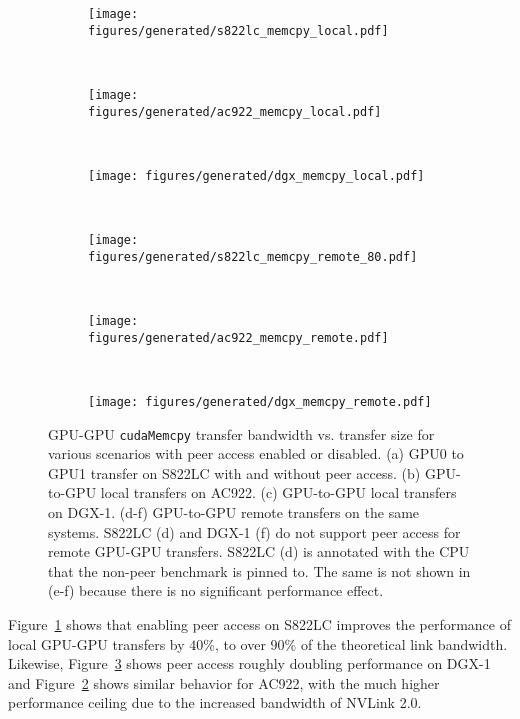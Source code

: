 \begin{figure}[H]
	\centering
	\begin{subfigure}[b]{0.3\textwidth}
		\texttt{[image: figures/generated/s822lc\_memcpy\_local.pdf]}
		\caption{}
		\label{fig:explicit-s822lc-gpu-gpu-local}
	\end{subfigure}
	~
	\begin{subfigure}[b]{0.3\textwidth}
		\texttt{[image: figures/generated/ac922\_memcpy\_local.pdf]}
		\caption{}
		\label{fig:explicit-ac922-gpu-gpu-local}
	\end{subfigure}
	~
	\begin{subfigure}[b]{0.3\textwidth}
		\texttt{[image: figures/generated/dgx\_memcpy\_local.pdf]}
		\caption{}
		\label{fig:explicit-dgx-gpu-gpu-local}
	\end{subfigure}
	\\
	\begin{subfigure}[b]{0.3\textwidth}
		\texttt{[image: figures/generated/s822lc\_memcpy\_remote\_80.pdf]}
		\caption{}
		\label{fig:explicit-s822lc-gpu-gpu-remote}
	\end{subfigure}
	~
	\begin{subfigure}[b]{0.3\textwidth}
		\texttt{[image: figures/generated/ac922\_memcpy\_remote.pdf]}
		\caption{}
		\label{fig:explicit-ac922-gpu-gpu-remote}
	\end{subfigure}
	~
	\begin{subfigure}[b]{0.3\textwidth}
		\texttt{[image: figures/generated/dgx\_memcpy\_remote.pdf]}
		\caption{}
		\label{fig:explicit-dgx-gpu-gpu-remote}
	\end{subfigure}
	\caption[GPU-GPU \texttt{cudaMemcpy} bandwidth and peer access]{
		GPU-GPU \texttt{cudaMemcpy} transfer bandwidth vs. transfer size for various scenarios with peer access enabled or disabled.
		(a) GPU0 to GPU1 transfer on S822LC with and without peer access.
		(b) GPU-to-GPU local transfers on AC922.
		(c) GPU-to-GPU local transfers on DGX-1.
		(d-f) GPU-to-GPU remote transfers on the same systems.
		S822LC (d) and DGX-1 (f) do not support peer access for remote GPU-GPU transfers.
		S822LC (d) is annotated with the CPU that the non-peer benchmark is pinned to.
		The same is not shown in (e-f) because there is no significant performance effect.
	}
	\label{fig:explicit-peer}
\end{figure}

Figure~\ref{fig:explicit-s822lc-gpu-gpu-local} shows that enabling peer access on S822LC improves the performance of local GPU-GPU transfers by \mytilde$40$\%, to over $90$\% of the theoretical link bandwidth.
Likewise, Figure~\ref{fig:explicit-dgx-gpu-gpu-local} shows peer access roughly doubling performance on DGX-1 and Figure~\ref{fig:explicit-ac922-gpu-gpu-local} shows similar behavior for AC922, with the much higher performance ceiling due to the increased bandwidth of NVLink 2.0.

